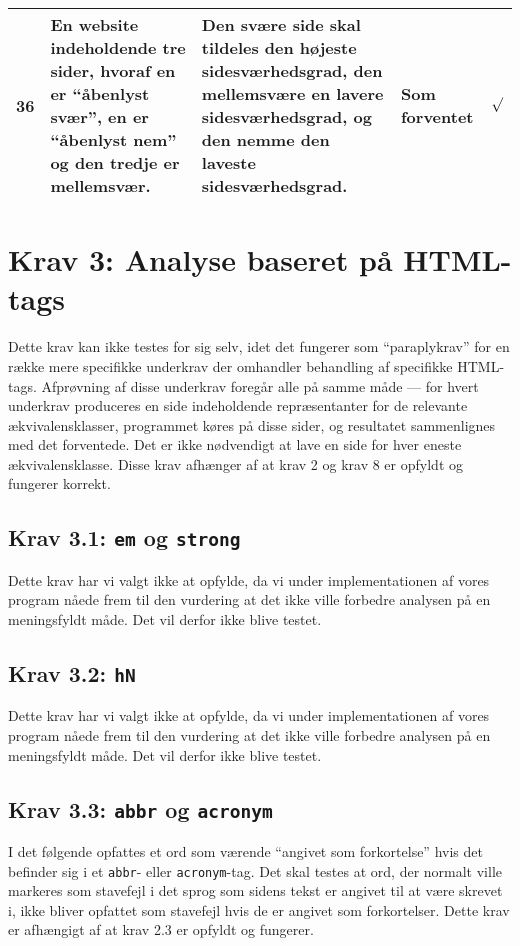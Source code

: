 \documentclass[a4paper,oneside,article]{memoir}
\begin{document}
\begin{landscape}
\begin{longtable}[c]{p{20pt}|p{220pt}|p{130pt}|p{130pt}|p{50pt}}
36 &
En website indeholdende tre sider, hvoraf en er ``åbenlyst svær'', en
er ``åbenlyst nem'' og den tredje er mellemsvær. &
Den svære side skal tildeles den højeste sidesværhedsgrad, den
mellemsvære en lavere sidesværhedsgrad, og den nemme den laveste
sidesværhedsgrad. &
Som forventet &
$\surd$ \\ \hline

\end{longtable}

\section{Krav 3: Analyse baseret på HTML-tags}

Dette krav kan ikke testes for sig selv, idet det fungerer som
``paraplykrav'' for en række mere specifikke underkrav der omhandler
behandling af specifikke HTML-tags. Afprøvning af disse underkrav
foregår alle på samme måde --- for hvert underkrav produceres en side
indeholdende repræsentanter for de relevante ækvivalensklasser,
programmet køres på disse sider, og resultatet sammenlignes med det
forventede. Det er ikke nødvendigt at lave en side for hver eneste
ækvivalensklasse. Disse krav afhænger af at krav 2 og krav 8 er
opfyldt og fungerer korrekt.

\subsection{Krav 3.1: \texttt{em} og \texttt{strong}}

Dette krav har vi valgt ikke at opfylde, da vi under implementationen
af vores program nåede frem til den vurdering at det ikke ville
forbedre analysen på en meningsfyldt måde. Det vil derfor ikke blive
testet.

\subsection{Krav 3.2: \texttt{hN}}

Dette krav har vi valgt ikke at opfylde, da vi under implementationen
af vores program nåede frem til den vurdering at det ikke ville
forbedre analysen på en meningsfyldt måde. Det vil derfor ikke blive
testet.

\subsection{Krav 3.3: \texttt{abbr} og \texttt{acronym}}

I det følgende opfattes et ord som værende ``angivet som forkortelse''
hvis det befinder sig i et \texttt{abbr}- eller
\texttt{acronym}-tag. Det skal testes at ord, der normalt ville
markeres som stavefejl i det sprog som sidens tekst er angivet til at
være skrevet i, ikke bliver opfattet som stavefejl hvis de er angivet
som forkortelser. Dette krav er afhængigt af at krav 2.3 er opfyldt og
fungerer.


\end{landscape}
\end{document}
